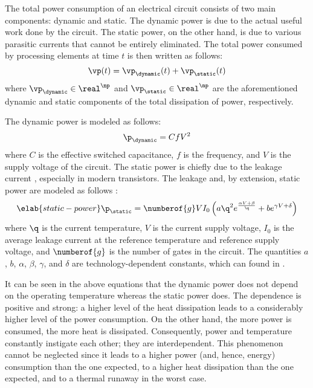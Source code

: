 The total power consumption of an electrical circuit consists of two main
components: dynamic and static. The dynamic power is due to the actual useful
work done by the circuit. The static power, on the other hand, is due to various
parasitic currents that cannot be entirely eliminated. The total power consumed
by \np processing elements at time $t$ is then written as follows:
\[
  \vp(t) = \vp_\dynamic(t) + \vp_\static(t)
\]
where $\vp_\dynamic \in \real^\np$ and $\vp_\static \in \real^\np$ are the
aforementioned dynamic and static components of the total dissipation of power,
respectively.

The dynamic power is modeled as follows:
\[
  \p_\dynamic = C f V^2
\]
where $C$ is the effective switched capacitance, $f$ is the frequency, and $V$
is the supply voltage of the circuit. The static power is chiefly due to the
leakage current \cite{chandrakasan2000, srivastava2010, juan2011, juan2012},
especially in modern  transistors. The leakage and, by extension,
static power are modeled as follows \cite{liao2005}:
\begin{equation} \elab{static-power}
  \p_\static = \numberof{g} V I_0 \left(a \q^2 e^{\frac{\alpha V + \beta}{\q}} + b e^{\gamma V + \delta}\right)
\end{equation}
where $\q$ is the current temperature, $V$ is the current supply voltage, $I_0$
is the average leakage current at the reference temperature and reference supply
voltage, and $\numberof{g}$ is the number of gates in the circuit. The
quantities $a$, $b$, $\alpha$, $\beta$, $\gamma$, and $\delta$ are
technology-dependent constants, which can found in \cite{liao2005}.

It can be seen in the above equations that the dynamic power does not depend on
the operating temperature whereas the static power does. The dependence is
positive and strong: a higher level of the heat dissipation leads to a
considerably higher level of the power consumption. On the other hand, the more
power is consumed, the more heat is dissipated. Consequently, power and
temperature constantly instigate each other; they are interdependent. This
phenomenon cannot be neglected since it leads to a higher power (and, hence,
energy) consumption than the one expected, to a higher heat dissipation than the
one expected, and to a thermal runaway in the worst case.
